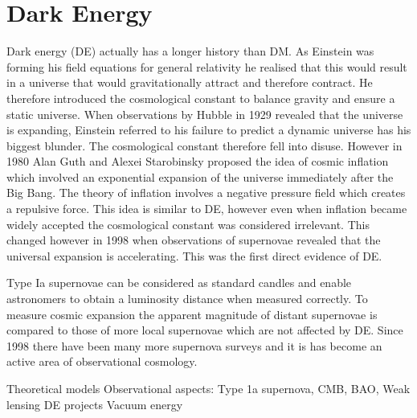 \documentclass[a4paper,12pt]{article}
\begin{document}
\section{Dark Energy}
Dark energy (DE) actually has a longer history than DM. As Einstein was forming his field equations for general relativity he realised that this would result in a universe that would
gravitationally attract and therefore contract. He therefore introduced the cosmological constant to balance gravity and ensure a static universe. When observations by Hubble in 1929
revealed that the universe is expanding, Einstein referred to his failure to predict a dynamic universe has his biggest blunder. The cosmological constant therefore fell into disuse.
However in 1980 Alan Guth and Alexei Starobinsky proposed the idea of cosmic inflation which involved an exponential expansion of the universe immediately after the Big Bang. The theory
of inflation involves a negative pressure field which creates a repulsive force. This idea is similar to DE, however even when inflation became widely accepted the 
cosmological constant was considered irrelevant. This changed however in 1998 when observations of supernovae revealed that the universal expansion is accelerating. This was the first
direct evidence of DE.

Type Ia supernovae can be considered as standard candles and enable astronomers to obtain a luminosity distance when measured correctly. To measure cosmic expansion the apparent magnitude
of distant supernovae is compared to those of more local supernovae which are not affected by DE. Since 1998 there have been many more supernova surveys and it is has become an active
area of observational cosmology. 



Theoretical models
Observational aspects: Type 1a supernova, CMB, BAO, Weak lensing
DE projects
Vacuum energy

% 
\end{document}
